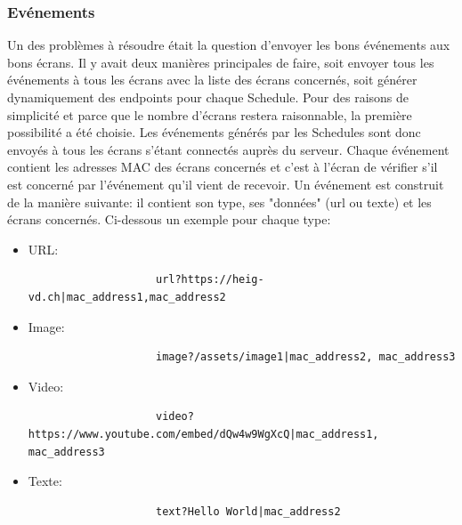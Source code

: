 \documentclass[french]{article}
\begin{document}
\subsubsection{Evénements}
Un des problèmes à résoudre était la question d'envoyer les bons événements aux bons écrans.
 Il y avait deux manières principales de faire, soit envoyer tous les événements à tous les écrans avec la liste des écrans concernés, soit générer dynamiquement des endpoints pour chaque Schedule. Pour des raisons de simplicité et parce que le nombre d'écrans restera raisonnable, la première possibilité a été choisie. \newline
Les événements générés par les Schedules sont donc envoyés à tous les écrans s'étant connectés auprès du serveur. Chaque événement contient les adresses MAC des écrans concernés et c'est à l'écran de vérifier s'il est concerné par l'événement qu'il vient de recevoir.\newline
Un événement est construit de la manière suivante: il contient son type, ses "données" (url ou texte) et les écrans concernés. \newline
Ci-dessous un exemple pour chaque type:\newline


\begin{itemize}
	\item URL:\begin{verbatim}
					url?https://heig-vd.ch|mac_address1,mac_address2
			  \end{verbatim}
	\item Image: \begin{verbatim}
					image?/assets/image1|mac_address2, mac_address3
			  \end{verbatim}
	\item Video: \begin{verbatim}
					video?https://www.youtube.com/embed/dQw4w9WgXcQ|mac_address1, mac_address3
			  \end{verbatim}
	\item Texte: \begin{verbatim}
					text?Hello World|mac_address2
			  \end{verbatim}
\end{itemize}
\end{document}
